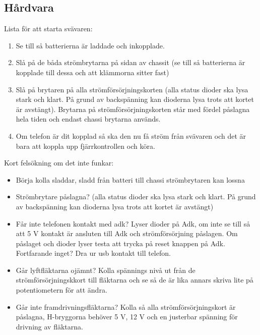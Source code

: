 \subsection{Hårdvara}

Lista för att starta svävaren:
\begin{enumerate}
\item Se till så batterierna är laddade och inkopplade.
\item Slå på de båda strömbrytarna på sidan av chassit (se till så batterierna är kopplade till dessa och att klämmorna sitter fast)
\item Slå på brytaren på alla strömförsörjningskorten (alla status dioder ska lysa stark och klart. På grund av backspänning kan dioderna lysa trots att kortet är avstängt). Brytarna på strömförsörjningskorten står med fördel påslagna hela tiden och endast chassi brytarna används.
\item Om telefon är dit kopplad så ska den nu få ström från svävaren och det är bara att koppla upp fjärrkontrollen och köra.\\
\end{enumerate}


Kort felsökning om det inte funkar:
\begin{itemize}
\item Börja kolla sladdar, sladd från batteri till chassi strömbrytaren kan lossna
\item Strömbrytare påslagna? (alla status dioder ska lysa stark och klart. På grund av backspänning kan dioderna lysa trots att kortet är avstängt)
\item Får inte telefonen kontakt med adk? Lyser dioder på Adk, om inte se till så att 5 V kontakt är ansluten till Adk och strömförsörjning påslagen. Om påslaget och dioder lyser testa att  trycka på reset knappen på Adk. Fortfarande inget? Dra ur usb kontakt till telefon. 
\item Går lyftfläktarna ojämnt? Kolla spännings nivå ut från de strömförsörjningskkort till fläktarna och se så de är lika annars skriva lite på potentiometern för att ändra.
\item Går inte framdrivningsfläktarna? Kolla så alla strömförsörjningskort är påslagna, H-bryggorna behöver 5 V, 12 V och en justerbar spänning för drivning av fläktarna.
\end{itemize}
